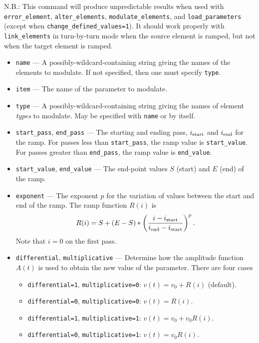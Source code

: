 \documentclass[11pt]{article}
\begin{document}
N.B.: This command will produce unpredictable results when used with
\verb|error_element|, \verb|alter_elements|, \verb|modulate_elements|, and
\verb|load_parameters| (except when \verb|change_defined_values=1|).
It should work properly with \verb|link_elements| in turn-by-turn mode
when the source element is ramped, but not when the target element
is ramped.

\begin{itemize}
\item \verb|name| --- A possibly-wildcard-containing string giving the names of the
        elements to modulate. If not specified, then one must specify \verb|type|.
\item \verb|item| --- The name of the parameter to modulate.
\item \verb|type| --- A possibly-wildcard-containing string giving the names of element
        {\em types} to modulate.  May be specified with \verb|name| or by itself.
\item \verb|start_pass|, \verb|end_pass| --- The starting and ending pass, 
  $i_{\rm start}$ and $i_{\rm end}$ for the ramp.
 For passes less than \verb|start_pass|, the ramp value is \verb|start_value|.
 For passes greater than \verb|end_pass|, the ramp value is \verb|end_value|.
\item \verb|start_value|, \verb|end_value| --- The end-point values $S$ (start) and $E$ (end) of the ramp.
\item \verb|exponent| --- The exponent $p$ for the variation of values between the start and end
  of the ramp.  The ramp function $R(i)$ is 
\begin{equation}
  R(i) = S + (E-S)*\left(\frac{i-i_{\rm start}}{i_{\rm end}-i_{\rm start}}\right)^p.
\end{equation}
Note that $i=0$ on the first pass.
\item \verb|differential|, \verb|multiplicative| --- Determine how the amplitude function
  $A(t)$ is used to obtain the new value of the parameter.  There are four cases
  \begin{itemize}
    \item \verb|differential=1|, \verb|multiplicative=0|: $v(t) = v_0 + R(i)$ (default).
    \item \verb|differential=0|, \verb|multiplicative=0|: $v(t) = R(i)$.  
    \item \verb|differential=1|, \verb|multiplicative=1|: $v(t) = v_0 + v_0 R(i)$.  
    \item \verb|differential=0|, \verb|multiplicative=1|: $v(t) = v_0 R(i)$.  

\end{itemize}
\end{itemize}
\end{document}
